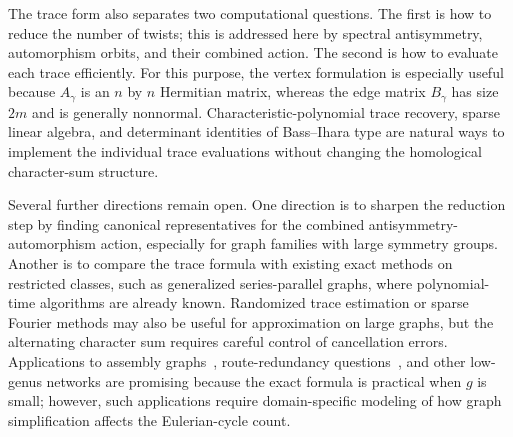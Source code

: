 \documentclass[11pt]{amsart}
\theoremstyle{plain}
\theoremstyle{definition}
\numberwithin{equation}{section}
\begin{document}
The trace form also separates two computational questions.  The first is how to reduce the number of twists; this is addressed here by spectral antisymmetry, automorphism orbits, and their combined action.  The second is how to evaluate each trace efficiently.  For this purpose, the vertex formulation is especially useful because $A_\gamma$ is an $n$ by $n$ Hermitian matrix, whereas the edge matrix $B_\gamma$ has size $2m$ and is generally nonnormal.  Characteristic-polynomial trace recovery, sparse linear algebra, and determinant identities of Bass--Ihara type are natural ways to implement the individual trace evaluations without changing the homological character-sum structure.

Several further directions remain open.  One direction is to sharpen the reduction step by finding canonical representatives for the combined antisymmetry-automorphism action, especially for graph families with large symmetry groups.  Another is to compare the trace formula with existing exact methods on restricted classes, such as generalized series-parallel graphs, where polynomial-time algorithms are already known.  Randomized trace estimation or sparse Fourier methods may also be useful for approximation on large graphs, but the alternating character sum requires careful control of cancellation errors.  Applications to assembly graphs~\cite{PTW2001eulerian,CPT2011debruijn}, route-redundancy questions~\cite{EJ1973matching}, and other low-genus networks are promising because the exact formula is practical when $g$ is small; however, such applications require domain-specific modeling of how graph simplification affects the Eulerian-cycle count.





\end{document}
